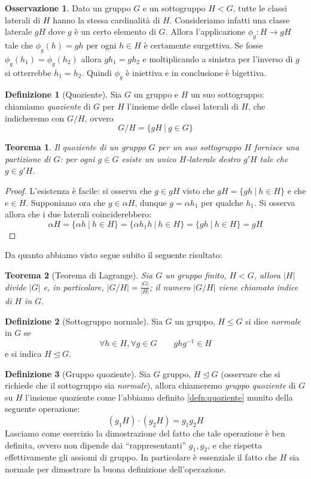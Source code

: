 \documentclass[11pt]{article}
\theoremstyle{plain}
\newtheorem{thm}{Teorema}[section]
\theoremstyle{definition}
\newtheorem{defn}{Definizione}[section]
\newtheorem*{rem}{Osservazione}
\theoremstyle{remark}
\begin{document}
\begin{rem}
	Dato un gruppo $G$ e un sottogruppo $H<G$, tutte le classi laterali di $H$ hanno la stessa cardinalità di $H$.
	Consideriamo infatti una classe laterale $gH$ dove $g$ è un certo elemento di $G$. Allora l'applicazione $\phi_g:H\to gH$
	tale che $\phi_g(h) = gh$ per ogni $h\in H$ è certamente surgettiva. Se fosse $\phi_g(h_1) = \phi_g(h_2)$ allora $gh_1 = gh_2$ e moltiplicando
	a sinistra per l'inverso di $g$ si otterrebbe $h_1 = h_2$. Quindi $\phi_g$ è iniettiva e in conclusione è bigettiva.
\end{rem}

\begin{defn}[Quoziente]\label{defn:quoziente}
	Sia $G$ un gruppo e $H$ un suo sottogruppo: chiamiamo \emph{quoziente} di $G$ per $H$ l'insieme delle classi laterali di $H$, che indicheremo con $G/H$, ovvero
	\[G/H=\{gH\ |\ g\in G\}\]
\end{defn}

\begin{thm}
	Il quoziente di un gruppo $G$ per un suo sottogruppo $H$ fornisce una partizione di $G$: per ogni $g\in G$ esiste un unico $H$-laterale destro $g'H$ tale che $g\in g'H$.
\end{thm}
\begin{proof}
	L'esistenza è facile: si osserva che $g\in gH$ visto che $gH=\{gh\ |\ h\in H\}$ e che $e\in H$.
	Supponiamo ora che $g\in \alpha H$, dunque $g=\alpha h_1$ per qualche $h_1$. Si osserva allora che i due laterali coinciderebbero:
	\[\alpha H=\{ \alpha h\ |\ h\in H\} = \{ \alpha h_1 h\ |\ h\in H \} = \{ gh\ |\ h\in H\} = gH\]
\end{proof}

Da quanto abbiamo visto segue subito il seguente risultato:
\begin{thm}[Teorema di Lagrange]
	Sia $G$ un gruppo finito, $H<G$, allora $|H|$ divide $|G|$ e, in particolare, $\displaystyle |G/H|=\frac{|G|}{|H|}$; il numero $|G/H|$ viene chiamato \emph{indice} di $H$ in $G$.
\end{thm}


\begin{defn}[Sottogruppo normale]
Sia $G$ un gruppo, $H \leq G$ si dice \emph{normale} in $G$ se
\[\forall h\in H, \forall g\in G\qquad ghg^{-1}\in H\]
e si indica $H \trianglelefteq G$.
\end{defn}

\begin{defn}[Gruppo quoziente]
	Sia $G$ gruppo, $H\trianglelefteq G$ (osservare che si richiede che il sottogruppo sia \textit{normale}), allora chiameremo \textit{gruppo quoziente} di $G$ su $H$ l'insieme quoziente come l'abbiamo definito \eqref{defn:quoziente} munito della seguente operazione:
	\[(g_1H)\cdot(g_2H)=g_1g_2H\]
	Lasciamo come esercizio la dimostrazione del fatto che tale operazione è ben definita, ovvero non dipende dai ``rappresentanti'' $g_1,g_2$, e che rispetta effettivamente gli assiomi di gruppo. In particolare è essenziale il fatto che $H$ sia normale per dimostrare la buona definizione dell'operazione.
\end{defn}
\end{document}
